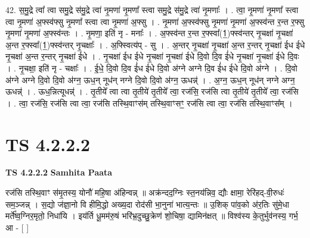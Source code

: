 \documentclass[17pt]{extarticle}
\begin{document}
42. स॒मु॒द्रे त्वा᳚ त्वा समु॒द्रे स॑मु॒द्रे त्वा॑ नृ॒मणा॑ नृ॒मणा᳚ स्त्वा समु॒द्रे स॑मु॒द्रे त्वा॑ नृ॒मणाः᳚ । . त्वा॒ नृ॒मणा॑ नृ॒मणा᳚ स्त्वा त्वा नृ॒मणा॑ अ॒फ्स्व॑फ्सु नृ॒मणा᳚ स्त्वा त्वा नृ॒मणा॑ अ॒फ्सु । . नृ॒मणा॑ अ॒फ्स्व॑फ्सु नृ॒मणा॑ नृ॒मणा॑ अ॒फ्स्व॑न्त र॒न्त र॒फ्सु नृ॒मणा॑ नृ॒मणा॑ अ॒फ्स्व॑न्तः । . नृ॒मणा॒ इति॑ नृ - मनाः᳚ । . अ॒फ्स्व॑न्त र॒न्त र॒फ्स्वा᳚(1॒)फ्स्व॑न्तर् नृ॒चक्षा॑ नृ॒चक्षा॑ अ॒न्त र॒फ्स्वा᳚(1॒)फ्स्व॑न्तर् नृ॒चक्षाः᳚ । . अ॒फ्स्वित्य॑प् - सु । . अ॒न्तर् नृ॒चक्षा॑ नृ॒चक्षा॑ अ॒न्त र॒न्तर् नृ॒चक्षा॑ ईध ईधे नृ॒चक्षा॑ अ॒न्त र॒न्तर् नृ॒चक्षा॑ ईधे । . नृ॒चक्षा॑ ईध ईधे नृ॒चक्षा॑ नृ॒चक्षा॑ ईधे दि॒वो दि॒व ई॑धे नृ॒चक्षा॑ नृ॒चक्षा॑ ईधे दि॒वः । . नृ॒चक्षा॒ इति॑ नृ - चक्षाः᳚ । . ई॒धे॒ दि॒वो दि॒व ई॑ध ईधे दि॒वो अ॑ग्ने अग्ने दि॒व ई॑ध ईधे दि॒वो अ॑ग्ने । . दि॒वो अ॑ग्ने अग्ने दि॒वो दि॒वो अ॑ग्न॒ ऊध॒न् नूध॑न् नग्ने दि॒वो दि॒वो अ॑ग्न॒ ऊधन्न्॑ । . अ॒ग्न॒ ऊध॒न् नूध॑न् नग्ने अग्न॒ ऊधन्न्॑ । . ऊध॒न्नित्यूधन्न्॑ । . तृ॒तीये᳚ त्वा त्वा तृ॒तीये॑ तृ॒तीये᳚ त्वा॒ रज॑सि॒ रज॑सि त्वा तृ॒तीये॑ तृ॒तीये᳚ त्वा॒ रज॑सि । . त्वा॒ रज॑सि॒ रज॑सि त्वा त्वा॒ रज॑सि तस्थि॒वाꣳस॑म् तस्थि॒वाꣳसꣳ॒॒ रज॑सि त्वा त्वा॒ रज॑सि तस्थि॒वाꣳस᳚म् । \newline
\pagebreak
{}

\section{ TS 4.2.2.2 }

\textbf{TS 4.2.2.2 } \newline
\textbf{Samhita Paata} \newline

रज॑सि तस्थि॒वाꣳ स॑मृ॒तस्य॒ योनौ॑ महि॒षा अ॑हिन्वन्न् ॥ अक्र॑न्दद॒ग्निः स्त॒नय॑न्निव॒ द्यौः क्षामा॒ रेरि॑हद्-वी॒रुधः॑ सम॒ञ्जन्न् । स॒द्यो ज॑ज्ञा॒नो वि हीमि॒द्धो अख्य॒दा रोद॑सी भा॒नुना॑ भात्य॒न्तः ॥ उ॒शिक् पा॑व॒को अ॑र॒तिः सु॑मे॒धा मर्ते᳚ष्व॒ग्निर॒मृतो॒ निधा॑यि । इय॑र्ति धू॒मम॑रु॒षं भरि॑भ्र॒दुच्छु॒क्रेण॑ शो॒चिषा॒ द्यामिन॑क्षत् ॥ विश्व॑स्य के॒तुर्भुव॑नस्य॒ गर्भ॒ आ - [  ] \newline
\end{document}
